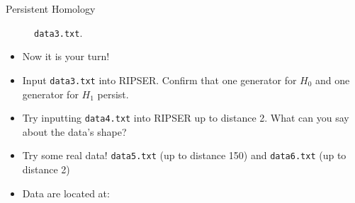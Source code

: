 \begin{frame}{Persistent Homology}
\begin{center}

\begin{figure}
\caption{\texttt{data3.txt}.}
\end{figure}
\end{center}
\begin{itemize}
\item Now it is your turn!
\item Input \texttt{data3.txt} into RIPSER. Confirm that one generator for $H_0$ and one generator for $H_1$ persist.
\item Try inputting \texttt{data4.txt} into RIPSER up to distance 2. What can you say about the data's shape?
\item Try some real data! \texttt{data5.txt} (up to distance 150) and \texttt{data6.txt} (up to distance 2)
\item Data are located at:
\end{itemize}
\end{frame}